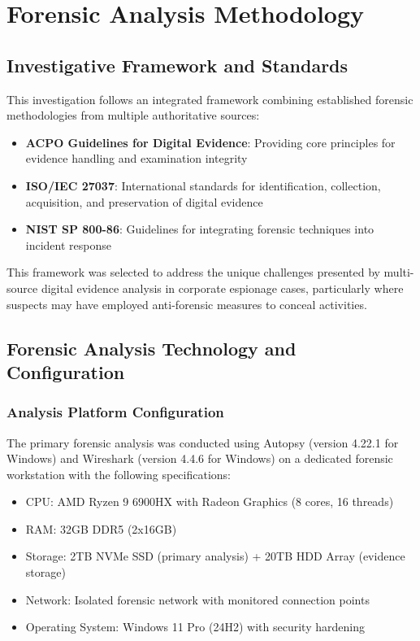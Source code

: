 \chapter{Forensic Analysis Methodology}

\section{Investigative Framework and Standards}
This investigation follows an integrated framework combining established forensic methodologies from multiple authoritative sources:

\begin{itemize}
    \item \textbf{ACPO Guidelines for Digital Evidence}: Providing core principles for evidence handling and examination integrity
    \item \textbf{ISO/IEC 27037}: International standards for identification, collection, acquisition, and preservation of digital evidence
    \item \textbf{NIST SP 800-86}: Guidelines for integrating forensic techniques into incident response
\end{itemize}

This framework was selected to address the unique challenges presented by multi-source digital evidence analysis in corporate espionage cases, particularly where suspects may have employed anti-forensic measures to conceal activities.

\section{Forensic Analysis Technology and Configuration}

\subsection{Analysis Platform Configuration}
The primary forensic analysis was conducted using Autopsy (version 4.22.1 for Windows) and Wireshark (version 4.4.6 for Windows) on a dedicated forensic workstation with the following specifications:

\begin{itemize}
    \item CPU: AMD Ryzen 9 6900HX with Radeon Graphics (8 cores, 16 threads)
    \item RAM: 32GB DDR5 (2x16GB)
    \item Storage: 2TB NVMe SSD (primary analysis) + 20TB HDD Array (evidence storage)
    \item Network: Isolated forensic network with monitored connection points
    \item Operating System: Windows 11 Pro (24H2) with security hardening
\end{itemize}

